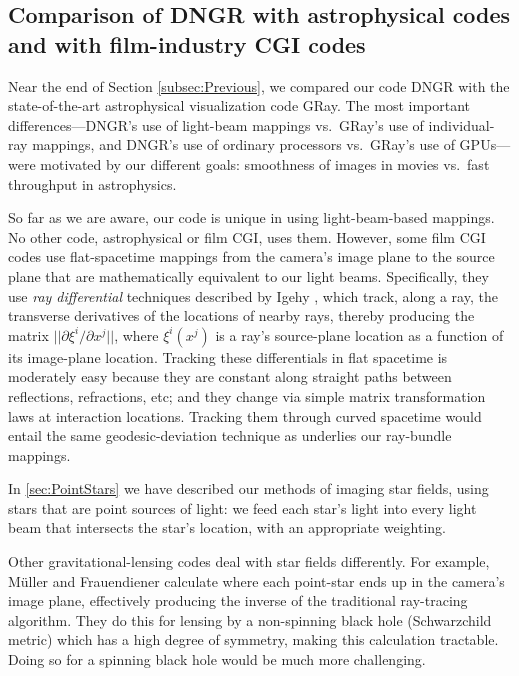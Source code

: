 \documentclass[12pt]{iopart}
\begin{document}
\subsection{Comparison of DNGR with astrophysical codes and with film-industry CGI codes}
\label{App:CompareCodes}

Near the end of Section \ref{subsec:Previous}, we compared our code DNGR with the state-of-the-art astrophysical visualization code GRay.  The most important differences---DNGR's use of light-beam
mappings vs.\ GRay's use of individual-ray mappings, and DNGR's use of ordinary processors vs.\ GRay's use of GPUs---were motivated by our different goals: smoothness of images
in movies vs.\ fast throughput in astrophysics.

So far as we are aware, our code is unique in using light-beam-based mappings.  No other code, astrophysical or film CGI, uses them.  However, some film CGI codes use flat-spacetime mappings from the camera's image plane to the source plane
that are mathematically equivalent to our light beams.  Specifically, they use \emph{ray differential} techniques described by Igehy \cite{Igehy99}, which track, along a ray, the transverse derivatives of the locations of nearby rays, thereby producing the matrix
$||\partial \xi^i/\partial x^j||$, where $\xi^i(x^j)$ is a ray's source-plane location as a function of its image-plane location.  Tracking these differentials in flat spacetime is 
moderately easy because they are constant along straight paths between reflections,
refractions, etc; and they change via simple matrix transformation laws at interaction locations.  Tracking them through curved spacetime would entail the same 
geodesic-deviation technique as underlies our ray-bundle mappings.

In  \ref{sec:PointStars} we have described our methods of imaging star fields, using stars that are point sources of light:  we feed each star's light into every light beam that intersects the star's location, with an appropriate weighting.

Other gravitational-lensing codes deal with star fields differently.  For example, 
M\"uller and Frauendiener \cite{Muller12} calculate where each point-star ends up in the camera's image plane, effectively producing the
inverse of the traditional ray-tracing algorithm. They do this for lensing by a non-spinning
black hole (Schwarzchild metric) which has a high degree of symmetry, making this calculation tractable.
Doing so  for a spinning black hole would be much more challenging.
\end{document}
